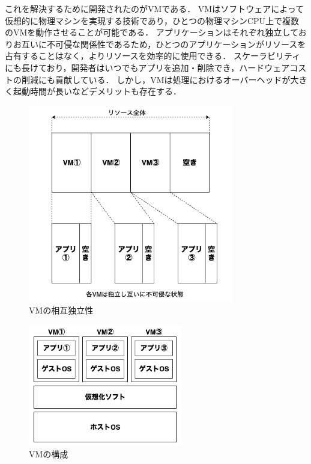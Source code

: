 これを解決するために開発されたのがVMである．
VMはソフトウェアによって仮想的に物理マシンを実現する技術であり，ひとつの物理マシンCPU上で複数のVMを動作させることが可能である．
アプリケーションはそれぞれ独立しておりお互いに不可侵な関係性であるため，ひとつのアプリケーションがリソースを占有することはなく，よりリソースを効率的に使用できる．
スケーラビリティにも長けており，開発者はいつでもアプリを追加・削除でき，ハードウェアコストの削減にも貢献している．
しかし，VMは処理におけるオーバーヘッドが大きく起動時間が長いなどデメリットも存在する．

\begin{figure}[htbp]
\begin{center}
    \includegraphics[width=0.8\textwidth]{./figures/resource-on-vm.jpg}
    \caption{VMの相互独立性}
\end{center}
\end{figure}

\begin{figure}[htbp]
\begin{center}
    \includegraphics[width=0.6\textwidth]{./figures/vm-structure.jpg}
    \caption{VMの構成}
\end{center}
\end{figure}

